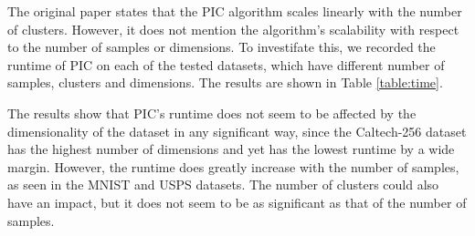 The original paper states that the PIC algorithm scales linearly with the number of clusters. However, it does not mention the algorithm's scalability with respect to the number of samples or dimensions. To investifate this, we recorded the runtime of PIC on each of the tested datasets, which have different number of samples, clusters and dimensions. The results are shown in Table \ref{table:time}.

The results show that PIC's runtime does not seem to be affected by the dimensionality of the dataset in any significant way, since the Caltech-256 dataset has the highest number of dimensions and yet has the lowest runtime by a wide margin. However, the runtime does greatly increase with the number of samples, as seen in the MNIST and USPS datasets. The number of clusters could also have an impact, but it does not seem to be as significant as that of the number of samples.
